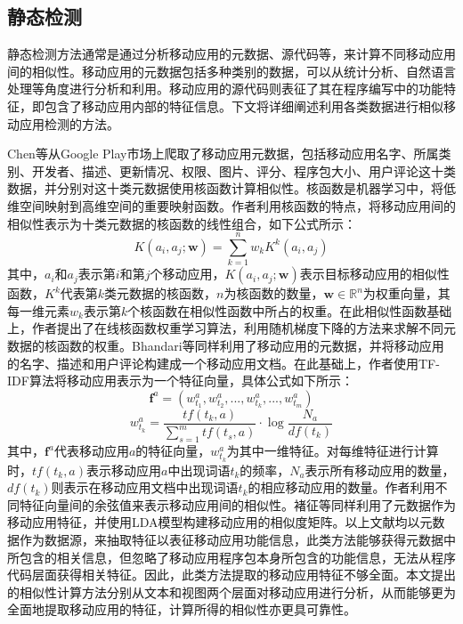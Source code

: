\subsection{静态检测}
静态检测方法通常是通过分析移动应用的元数据、源代码等，来计算不同移动应用间的相似性。移动应用的元数据包括多种类别的数据，可以从统计分析、自然语言处理等角度进行分析和利用。移动应用的源代码则表征了其在程序编写中的功能特征，即包含了移动应用内部的特征信息。下文将详细阐述利用各类数据进行相似移动应用检测的方法。

Chen等\cite{chen2015simapp}从Google Play市场上爬取了移动应用元数据，包括移动应用名字、所属类别、开发者、描述、更新情况、权限、图片、评分、程序包大小、用户评论这十类数据，并分别对这十类元数据使用核函数计算相似性。核函数是机器学习中，将低维空间映射到高维空间的重要映射函数。作者利用核函数的特点，将移动应用间的相似性表示为十类元数据的核函数的线性组合，如下公式所示：
\begin{equation}
K(a_i, a_j; \mathbf{w}) = \sum_{k=1}^{n} w_k K^k (a_i, a_j)
\end{equation}
其中，$a_i$和$a_j$表示第$i$和第$j$个移动应用，$K(a_i, a_j; \mathbf{w})$表示目标移动应用的相似性函数，$K^k$代表第$k$类元数据的核函数，$n$为核函数的数量，$\mathbf{w} \in \mathbb{R}^n$为权重向量，其每一维元素$w_k$表示第$k$个核函数在相似性函数中所占的权重。在此相似性函数基础上，作者提出了在线核函数权重学习算法，利用随机梯度下降\cite{spall2005introduction}的方法来求解不同元数据的核函数的权重。Bhandari等\cite{bhandari2013serendipitous}同样利用了移动应用的元数据，并将移动应用的名字、描述和用户评论构建成一个移动应用文档。在此基础上，作者使用TF-IDF\cite{sparck1972statistical}算法将移动应用表示为一个特征向量，具体公式如下所示：
\begin{equation}
\mathbf{f}^a = (w_{t_1}^a, w_{t_2}^a, ..., w_{t_k}^a, ..., w_{t_m}^a)
\end{equation}
\begin{equation}
w_{t_k}^a = \frac{tf(t_k, a)}{\sum_{s=1}^{m} tf(t_s, a)} \cdot \log \frac{N_a}{df(t_k)}
\end{equation}
其中，$\mathbf{f}^a$代表移动应用$a$的特征向量，$w_{t_k}^a$为其中一维特征。对每维特征进行计算时，$tf(t_k, a)$表示移动应用$a$中出现词语$t_k$的频率，$N_a$表示所有移动应用的数量，$df(t_k)$则表示在移动应用文档中出现词语$t_k$的相应移动应用的数量。作者利用不同特征向量间的余弦值来表示移动应用间的相似性。褚征等\cite{chu2017construction}同样利用了元数据作为移动应用特征，并使用LDA模型\cite{blei2003latent}构建移动应用的相似度矩阵。以上文献均以元数据作为数据源，来抽取特征以表征移动应用功能信息，此类方法能够获得元数据中所包含的相关信息，但忽略了移动应用程序包本身所包含的功能信息，无法从程序代码层面获得相关特征。因此，此类方法提取的移动应用特征不够全面。本文提出的相似性计算方法分别从文本和视图两个层面对移动应用进行分析，从而能够更为全面地提取移动应用的特征，计算所得的相似性亦更具可靠性。


